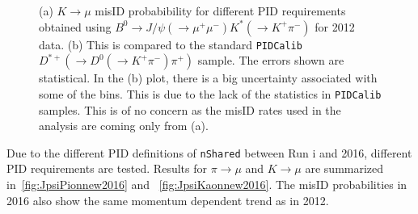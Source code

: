 \begin{figure}[h!]
		\caption{(a) $K \rightarrow \mu$ misID probabibility for different PID requirements obtained using $B^{0} \rightarrow J/\psi(\rightarrow \mu^{+} \mu^{-}) K^{*} (\rightarrow {K^{+} \pi^{-}} )$ for 2012 data. (b) This is compared to the standard \texttt{PIDCalib} $D^{*+}(\rightarrow D^{0}(\rightarrow K^{+} \pi^{-}) \pi^{+})$ sample. The errors shown are statistical. In the (b) plot, there is a big uncertainty associated with some of the bins. This is due to the lack of the statistics in \texttt{PIDCalib} samples. This is of no concern as the misID rates used in the analysis are coming only from (a).}
		\label{fig:JpsiKaonnew}
\end{figure}

Due to the different \gls{PID} definitions of \texttt{nShared} between Run \Rn{1} and 2016, different \gls{PID} requirements are tested.  Results for $\pi \rightarrow \mu$ and $K \rightarrow \mu$ are summarized in~\autoref{fig:JpsiPionnew2016} and
~\autoref{fig:JpsiKaonnew2016}. The misID probabilities in 2016 also show the same momentum dependent trend as in 2012. 



